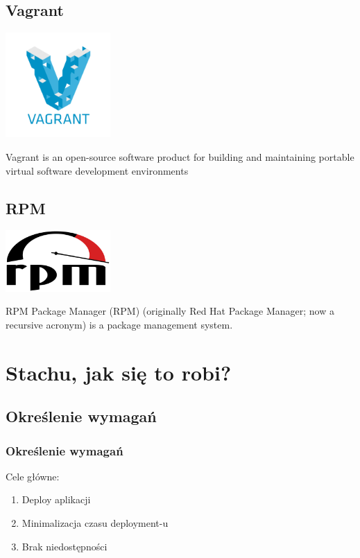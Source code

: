 \documentclass[10pt]{beamer}
\begin{document}
\subsection{Vagrant}
\begin{frame}
\begin{center}
\includegraphics[width=0.3\textwidth]{vagrant.png}
\end{center}
Vagrant is an open-source software product for building and maintaining portable virtual software development environments
\end{frame}
\subsection{RPM}
\begin{frame}
\begin{center}
\includegraphics[width=0.3\textwidth]{500px-RPM_Logo.png}
\end{center}
RPM Package Manager (RPM) (originally Red Hat Package Manager; now a recursive acronym) is a package management system.
\end{frame}
\section{Stachu, jak się to robi?}
\subsection{Określenie wymagań}
\begin{frame}
\frametitle{Określenie wymagań}
Cele główne:
\begin{enumerate}
\item{Deploy aplikacji}
\item{Minimalizacja czasu deployment-u}
\item{Brak niedostępności}
\end{enumerate}
\end{frame}
\end{document}
